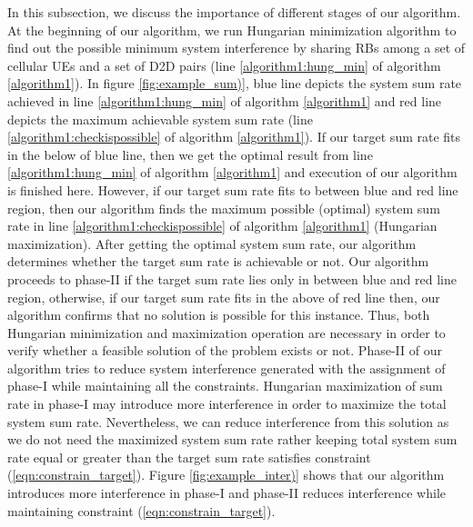 \documentclass{ieeeaccess}
\begin{document}
In this subsection, we discuss the importance of different stages of our algorithm. At the beginning of our algorithm, we run Hungarian minimization algorithm \cite{hungarian} to find out the possible minimum system interference by sharing RBs among a set of cellular UEs and a set of D2D pairs (line \ref{algorithm1:hung_min} of algorithm \ref{algorithm1}). In figure \ref{fig:example_sum)}, blue line depicts the system sum rate achieved in line \ref{algorithm1:hung_min} of algorithm \ref{algorithm1} and red line depicts the maximum achievable system sum rate (line \ref{algorithm1:checkispossible} of  algorithm \ref{algorithm1}). If our target sum rate fits in the below of blue line, then we  get the optimal result from line \ref{algorithm1:hung_min} of algorithm \ref{algorithm1}  and execution of our algorithm is finished here. However, if our target sum rate fits to between blue and red line region, then our algorithm finds the maximum possible (optimal) system sum rate in line \ref{algorithm1:checkispossible} of algorithm \ref{algorithm1} (Hungarian maximization). After getting the optimal system sum rate, our algorithm determines whether the target sum rate is achievable or not. Our algorithm proceeds to phase-II if the target sum rate lies only in between blue and red line region, otherwise, if our target sum rate fits in the above of red line then, our algorithm confirms that no solution is possible for this instance. Thus, both Hungarian minimization and maximization operation are necessary in order to verify whether a feasible solution of the problem exists or not. Phase-II of our algorithm tries to reduce system interference generated with the assignment of phase-I while maintaining all the constraints. Hungarian maximization of sum rate in phase-I may introduce more interference in order to maximize the total system sum rate. Nevertheless, we can reduce interference from this solution as we do not need the maximized system sum rate rather  keeping total system sum rate equal or greater than the target sum rate satisfies constraint (\ref{eqn:constrain_target}). Figure \ref{fig:example_inter)} shows that our algorithm introduces more interference in phase-I and phase-II reduces interference while maintaining constraint (\ref{eqn:constrain_target}).
\end{document}
